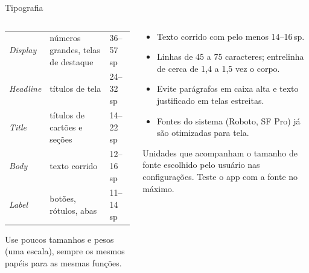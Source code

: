 \documentclass[aspectratio=169,10pt]{beamer}
\begin{document}
\begin{frame}{Tipografia}
  \begin{columns}[T]
    \begin{column}{0.48\textwidth}
      \scriptsize
      \begin{tabularx}{\linewidth}{@{}l L l@{}}
        \toprule
         &  &  \\
        \midrule
        \emph{Display} & números grandes, telas de destaque & 36--57\,sp \\
        \emph{Headline} & títulos de tela & 24--32\,sp \\
        \emph{Title} & títulos de cartões e seções & 14--22\,sp \\
        \emph{Body} & texto corrido & 12--16\,sp \\
        \emph{Label} & botões, rótulos, abas & 11--14\,sp \\
        \bottomrule
      \end{tabularx}
      \begin{dica}
        Use poucos tamanhos e pesos (uma escala), sempre os mesmos papéis para as mesmas funções.
      \end{dica}
    \end{column}
    \begin{column}{0.5\textwidth}
      \begin{conceito}[Legibilidade]
        \begin{itemize}
          \item Texto corrido com pelo menos 14--16\,sp.
          \item Linhas de 45 a 75 caracteres; entrelinha de cerca de 1,4 a 1,5 vez o corpo.
          \item Evite parágrafos em caixa alta e texto justificado em telas estreitas.
          \item Fontes do sistema (Roboto, SF Pro) já são otimizadas para tela.
        \end{itemize}
      \end{conceito}
      \begin{definicao}
        Unidades que acompanham o tamanho de fonte escolhido pelo usuário nas configurações. Teste o app com a fonte no máximo.
      \end{definicao}
    \end{column}
  \end{columns}
\end{frame}
\end{document}
